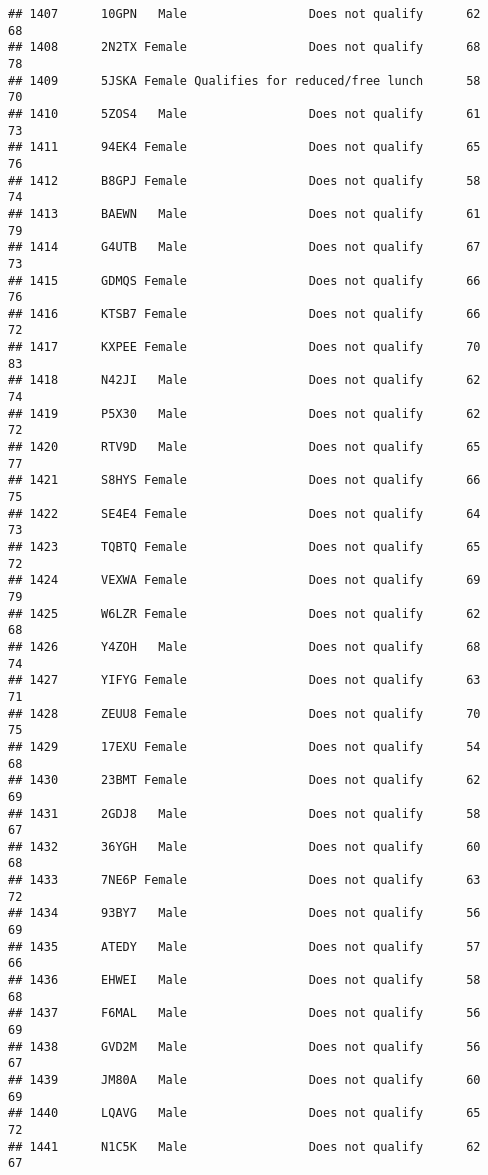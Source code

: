 \documentclass[
]{article}
\begin{document}
\begin{verbatim}
## 1407      10GPN   Male                 Does not qualify      62       68
## 1408      2N2TX Female                 Does not qualify      68       78
## 1409      5JSKA Female Qualifies for reduced/free lunch      58       70
## 1410      5ZOS4   Male                 Does not qualify      61       73
## 1411      94EK4 Female                 Does not qualify      65       76
## 1412      B8GPJ Female                 Does not qualify      58       74
## 1413      BAEWN   Male                 Does not qualify      61       79
## 1414      G4UTB   Male                 Does not qualify      67       73
## 1415      GDMQS Female                 Does not qualify      66       76
## 1416      KTSB7 Female                 Does not qualify      66       72
## 1417      KXPEE Female                 Does not qualify      70       83
## 1418      N42JI   Male                 Does not qualify      62       74
## 1419      P5X30   Male                 Does not qualify      62       72
## 1420      RTV9D   Male                 Does not qualify      65       77
## 1421      S8HYS Female                 Does not qualify      66       75
## 1422      SE4E4 Female                 Does not qualify      64       73
## 1423      TQBTQ Female                 Does not qualify      65       72
## 1424      VEXWA Female                 Does not qualify      69       79
## 1425      W6LZR Female                 Does not qualify      62       68
## 1426      Y4ZOH   Male                 Does not qualify      68       74
## 1427      YIFYG Female                 Does not qualify      63       71
## 1428      ZEUU8 Female                 Does not qualify      70       75
## 1429      17EXU Female                 Does not qualify      54       68
## 1430      23BMT Female                 Does not qualify      62       69
## 1431      2GDJ8   Male                 Does not qualify      58       67
## 1432      36YGH   Male                 Does not qualify      60       68
## 1433      7NE6P Female                 Does not qualify      63       72
## 1434      93BY7   Male                 Does not qualify      56       69
## 1435      ATEDY   Male                 Does not qualify      57       66
## 1436      EHWEI   Male                 Does not qualify      58       68
## 1437      F6MAL   Male                 Does not qualify      56       69
## 1438      GVD2M   Male                 Does not qualify      56       67
## 1439      JM80A   Male                 Does not qualify      60       69
## 1440      LQAVG   Male                 Does not qualify      65       72
## 1441      N1C5K   Male                 Does not qualify      62       67

\end{verbatim}
\end{document}
